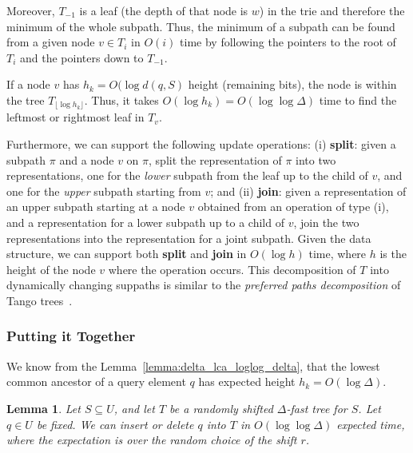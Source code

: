 \documentclass[a4paper,11pt]{article}
\newtheorem{lemma}[theorem]{Lemma}
\newcommand{\?}{\mskip1.5mu}
\begin{document}
Moreover, $T_{-1}$ is a leaf (the depth of that node is $w$) 
in the trie and therefore the minimum of the whole subpath. Thus, 
the minimum of a subpath can be found from a given node 
$v \in T_i$ in $O(i)$ time by following the
pointers to the root of $T_i$ and the pointers down to $T_{-1}$.

If a node $v$ has $h_k = O(\log d(q, S)$ height (remaining bits), 
the node is within
the tree $T_{\lfloor \log h_k \rfloor}$. Thus, it takes 
$O(\log h_k) = O(\log\log\Delta)$ time to find the leftmost
or rightmost leaf in $T_v$.

Furthermore, we can support the following update operations:
(i) \textbf{split}: given a subpath $\pi$ and a node $v$ on $\pi$, split 
the representation of $\pi$ into two representations, one for the 
\emph{lower} subpath from the leaf up to the child of $v$, and
one for the \emph{upper} subpath starting from $v$; and (ii) 
\textbf{join}: given a
representation of an upper subpath starting at a node $v$ obtained 
from an operation of type (i), and a representation for 
a lower subpath up to a child of $v$, join the two representations
into the representation for a joint subpath.
Given the data structure, we can support
both \textbf{split} and \textbf{join} in
 $O(\log h)$ time, where $h$ is the height of 
the node $v$ where the operation occurs. 
This decomposition of $T$ into dynamically changing suppaths
is similar to the \emph{preferred paths decomposition} of
Tango trees~\cite{DemaineHaIaPa07}.

\subsubsection{Putting it Together}

We know from the Lemma~\ref{lemma:delta_lca_loglog_delta}, that 
the lowest common ancestor of a query element $q$ has expected 
height $h_k = O(\log \Delta)$.

\begin{lemma}
\label{lemma:delta_insert}
Let $S \subseteq U$, and let $T$ be
a randomly shifted $\Delta$-fast tree for 
$S$.  Let $q \in U$ be fixed.
We can insert or delete $q$ into $T$
in $O(\log \log \Delta)$ expected time, where the expectation is 
over the random choice of the shift $r$.
\end{lemma}
\end{document}

